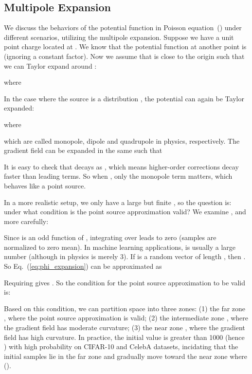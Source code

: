 \subsection{Multipole Expansion}
\label{sec:mul}
We discuss the behaviors of the potential function in Poisson equation~() under different scenarios, utilizing the multipole expansion. Suppose we have a unit point charge  located at . We know that the potential function at another point  is  (ignoring a constant factor). Now we assume that  is close to the origin such that we can Taylor expand around :

where

In the case where the source is a distribution , the potential  can again be Taylor expanded:

where 

which are called monopole, dipole and quadrupole in physics, respectively. The gradient field  can be expanded in the same such that

It is easy to check that  decays as , which means higher-order corrections decay faster than leading terms. So when , only the monopole term  matters, which behaves like a point source.

In a more realistic setup, we only have a large but finite , so the question is: under what condition is the point source approximation valid? We examine ,  and  more carefully:

Since  is an odd function of , integrating  over  leads to zero (samples are normalized to zero mean). In machine learning applications,  is usually a large number (although in physics  is merely 3). If  is a random vector of length , then . So Eq.~(\ref{eq:phi_expansion}) can be approximated as 

Requiring  gives . So the condition for the point source approximation to be valid is:

Based on this condition, we can partition space into three zones: (1) the far zone , where the point source approximation is valid; (2) the intermediate zone , where the gradient field has moderate curvature; (3) the near zone , where the gradient field has high curvature. In practice, the initial value  is greater than 1000 (hence ) with high probability on CIFAR-10 and CelebA datasets, incidating that the initial samples lie in the far zone and gradually move toward the near zone where  ().

